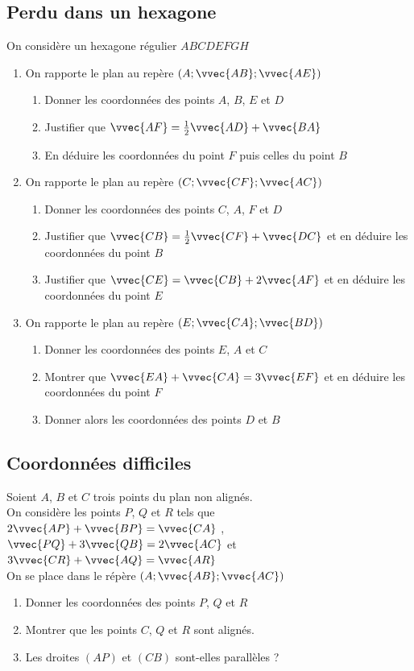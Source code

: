 \documentclass[oneside,12pt]{book}          %
\begin{document}
\subsection{Perdu dans un hexagone}
On considère un hexagone régulier $ABCDEFGH$
\begin{enumerate}
    \item On rapporte le plan au repère $(A;\vvec{AB};\vvec{AE})$
    \begin{enumerate}
        \item Donner les coordonnées des points $A$, $B$, $E$ et $D$
        \item Justifier que $\vvec{AF}=\frac{1}{2}\vvec{AD}+\vvec{BA}$
        \item En déduire les coordonnées du point $F$ puis celles du point $B$
    \end{enumerate}
    \item On rapporte le plan au repère $(C;\vvec{CF};\vvec{AC})$
    \begin{enumerate}
        \item Donner les coordonnées des points $C$, $A$, $F$ et $D$
        \item Justifier que $\vvec{CB}=\frac{1}{2}\vvec{CF}+\vvec{DC}$ et en déduire les coordonnées du point $B$
        \item Justifier que $\vvec{CE}=\vvec{CB}+2\vvec{AF}$ et en déduire les coordonnées du point $E$
    \end{enumerate}
    \item On rapporte le plan au repère $(E;\vvec{CA};\vvec{BD})$
    \begin{enumerate}
        \item Donner les coordonnées des points $E$, $A$ et $C$
        \item Montrer que $\vvec{EA}+\vvec{CA}=3\vvec{EF}$ et en déduire les coordonnées du point $F$
        \item Donner alors les coordonnées des points $D$ et $B$
    \end{enumerate}
\end{enumerate}



\subsection{Coordonnées difficiles}
Soient $A$, $B$ et $C$ trois points du plan non alignés.\\
On considère les points $P$, $Q$ et $R$ tels que $2\vvec{AP}+\vvec{BP}=\vvec{CA}$ , \quad $\vvec{PQ}+3\vvec{QB}=2\vvec{AC}$ et $3\vvec{CR}+\vvec{AQ}=\vvec{AR}$\\
On se place dans le répère $(A;\vvec{AB};\vvec{AC})$
\begin{enumerate}
    \item Donner les coordonnées des points $P$, $Q$ et $R$
    \item Montrer que les points $C$, $Q$ et $R$ sont alignés.
    \item Les droites $(AP)$ et $(CB)$ sont-elles parallèles ?
\end{enumerate}
\end{document}
